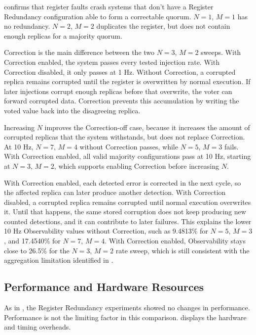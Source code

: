  confirms that register faults crash systems that don't have a Register Redundancy configuration able to form a correctable quorum. \(N=1\), \(M=1\) has no redundancy. \(N=2\), \(M=2\) duplicates the register, but does not contain enough replicas for a majority quorum.

Correction is the main difference between the two \(N=3\), \(M=2\) sweeps. With Correction enabled, the system passes every tested injection rate. With Correction disabled, it only passes at 1 Hz. Without Correction, a corrupted replica remains corrupted until the register is overwritten by normal execution. If later injections corrupt enough replicas before that overwrite, the voter can forward corrupted data. Correction prevents this accumulation by writing the voted value back into the disagreeing replica.

Increasing \(N\) improves the Correction-off case, because it increases the amount of corrupted replicas that the system withstands, but does not replace Correction. At 10 Hz, \(N=7\), \(M=4\) without Correction passes, while \(N=5\), \(M=3\) fails. With Correction enabled, all valid majority configurations pass at 10 Hz, starting at \(N=3\), \(M=2\), which supports enabling Correction before increasing \(N\).

With Correction enabled, each detected error is corrected in the next cycle, so the affected replica can later produce another detection. With Correction disabled, a corrupted replica remains corrupted until normal execution overwrites it. Until that happens, the same stored corruption does not keep producing new counted detections, and it can contribute to later failures. This explains the lower 10 Hz Observability values without Correction, such as 9.4813\% for \(N=5\), \(M=3\), and 17.4540\% for \(N=7\), \(M=4\). With Correction enabled, Observability stays close to 26.5\% for the \(N=3\), \(M=2\) rate sweep, which is still consistent with the aggregation limitation identified in .



\subsection{Performance and Hardware Resources}

As in , the Register Redundancy experiments showed no changes in performance. Performance is not the limiting factor in this comparison.  displays the hardware and timing overheads.

